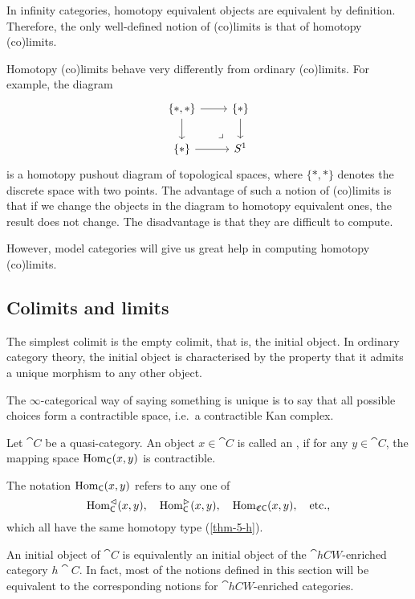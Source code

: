 In infinity categories,
homotopy equivalent objects are equivalent by definition.
Therefore, the only well-defined notion of (co)limits 
is that of homotopy (co)limits.

Homotopy (co)limits behave very differently from ordinary (co)limits.
For example, the diagram
\[\begin{tikzcd}
    \{*,*\} \ar[r] \ar[d] \ar[dr,phantom,pos=.75,"\lrcorner"] & \{*\} \ar[d] \\
    \{*\} \ar[r] & S^1
\end{tikzcd}\]
is a homotopy pushout diagram of topological spaces,
where $\{*,*\}$ denotes the discrete space with two points.
The advantage of such a notion of (co)limits is that 
if we change the objects in the diagram to homotopy equivalent ones,
the result does not change.
The disadvantage is that they are difficult to compute.

However, model categories will give us great help in computing
homotopy (co)limits.

\subsection{Colimits and limits}

The simplest colimit is the empty colimit, that is, the initial object.
In ordinary category theory, the initial object is characterised by
the property that it admits a unique morphism to any other object.

The $\infty$-categorical way of saying something is unique 
is to say that all possible choices form a contractible space,
i.e.\ a contractible Kan complex.

\begin{definition}
    Let $\cat C$ be a quasi-category.
    An object $x\in\cat C$ is called an ,
    if for any $y\in\cat C$, the mapping space $\operatorname{Hom}_{\textup{\textsf{C}}}(x,y)$ is contractible.
\end{definition}

The notation $\operatorname{Hom}_{\textup{\textsf{C}}}(x,y)$ refers to any one of
\[\operatorname{Hom}_{\textup{\textsf{C}}}^\vartriangleleft(x,y),\quad
\operatorname{Hom}_{\textup{\textsf{C}}}^\vartriangleright(x,y),\quad 
\operatorname{Hom}_{\mathfrak C\textup{\textsf{C}}}(x,y),\quad\text{etc.,} \]
which all have the same homotopy type (\ref{thm-5-h}).

\begin{remark}
    An initial object of $\cat C$
    is equivalently an initial object of the $\cat{hCW}$-enriched category $h\cat C$.
    In fact, most of the notions defined in this section will be equivalent to 
    the corresponding notions for $\cat{hCW}$-enriched categories. \varqed
\end{remark}

